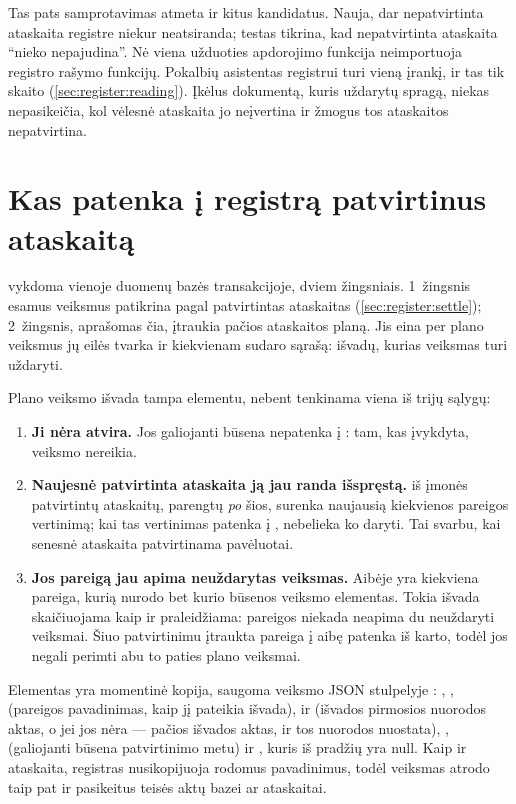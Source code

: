 Tas pats samprotavimas atmeta ir kitus kandidatus. Nauja, dar nepatvirtinta ataskaita registre
niekur neatsiranda; testas  tikrina, kad
nepatvirtinta ataskaita \enquote{nieko nepajudina}. Nė viena užduoties apdorojimo funkcija
neimportuoja registro rašymo funkcijų. Pokalbių asistentas registrui turi vieną įrankį, ir tas
tik skaito (\cref{sec:register:reading}). Įkėlus dokumentą, kuris uždarytų spragą, niekas
nepasikeičia, kol vėlesnė ataskaita jo neįvertina ir žmogus tos ataskaitos nepatvirtina.


\section{Kas patenka į registrą patvirtinus ataskaitą}\label{sec:register:plan}

 vykdoma vienoje duomenų bazės transakcijoje, dviem žingsniais.
1~žingsnis esamus veiksmus patikrina pagal patvirtintas ataskaitas (\cref{sec:register:settle});
2~žingsnis, aprašomas čia, įtraukia pačios ataskaitos planą. Jis eina per plano veiksmus jų
eilės tvarka ir kiekvienam sudaro  sąrašą: išvadų, kurias veiksmas turi uždaryti.

Plano veiksmo išvada tampa elementu, nebent tenkinama viena iš trijų sąlygų:

\begin{enumerate}
  \item \textbf{Ji nėra atvira.} Jos galiojanti būsena nepatenka į : tam, kas
    įvykdyta, veiksmo nereikia.
  \item \textbf{Naujesnė patvirtinta ataskaita ją jau randa išspręstą.} 
    iš įmonės patvirtintų ataskaitų, parengtų \emph{po} šios, surenka naujausią kiekvienos
    pareigos vertinimą; kai tas vertinimas patenka į , nebelieka ko daryti. Tai
    svarbu, kai senesnė ataskaita patvirtinama pavėluotai.
  \item \textbf{Jos pareigą jau apima neuždarytas veiksmas.} Aibėje  yra kiekviena
    pareiga, kurią nurodo bet kurio  būsenos veiksmo elementas. Tokia išvada
    skaičiuojama kaip  ir praleidžiama: pareigos niekada neapima du
    neuždaryti veiksmai. Šiuo patvirtinimu įtraukta pareiga į aibę patenka iš karto, todėl jos
    negali perimti abu to paties plano veiksmai.
\end{enumerate}

Elementas yra momentinė kopija, saugoma veiksmo JSON stulpelyje :
, ,  (pareigos pavadinimas, kaip jį pateikia
išvada),  ir  (išvados pirmosios nuorodos aktas, o jei jos nėra --- pačios
išvados aktas, ir tos nuorodos nuostata), ,  (galiojanti būsena
patvirtinimo metu) ir , kuris iš pradžių yra null. Kaip ir ataskaita, registras
nusikopijuoja rodomus pavadinimus, todėl veiksmas atrodo taip pat ir pasikeitus teisės aktų
bazei ar ataskaitai.

